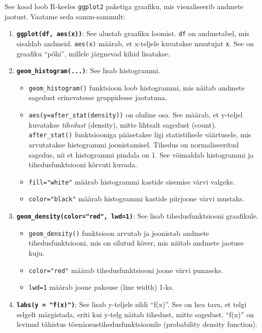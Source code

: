 \documentclass[
]{book}
\providecommand{\tightlist}{%
  \setlength{\itemsep}{0pt}\setlength{\parskip}{0pt}}
\theoremstyle{definition}
\theoremstyle{definition}
\theoremstyle{definition}
\theoremstyle{definition}
\theoremstyle{remark}
\begin{document}
See kood loob R-keeles \texttt{ggplot2} paketiga graafiku, mis visualiseerib andmete jaotust. Vaatame seda samm-sammult:

\begin{enumerate}
\def\labelenumi{\arabic{enumi}.}
\item
  \textbf{\texttt{ggplot(df,\ aes(x))}}: See alustab graafiku loomist. \texttt{df} on andmetabel, mis sisaldab andmeid. \texttt{aes(x)} määrab, et x-teljele kuvatakse muutujat \texttt{x}. See on graafiku ``põhi'', millele järgnevad kihid lisatakse.
\item
  \textbf{\texttt{geom\_histogram(...)}}: See lisab histogrammi.

  \begin{itemize}
  \tightlist
  \item
    \texttt{geom\_histogram()} funktsioon loob histogrammi, mis näitab andmete sagedust erinevatesse gruppidesse jaotatuna.
  \item
    \texttt{aes(y=after\_stat(density))} on oluline osa. See määrab, et y-teljel kuvatakse \emph{tihedust} (density), mitte lihtsalt sagedust (count). \texttt{after\_stat()} funktsiooniga pääsetakse ligi statistilisele väärtusele, mis arvutatakse histogrammi joonistamisel. Tihedus on normaliseeritud sagedus, nii et histogrammi pindala on 1. See võimaldab histogrammi ja tihedusfunktsiooni kõrvuti kuvada.
  \item
    \texttt{fill="white"} määrab histogrammi kastide sisemise värvi valgeks.
  \item
    \texttt{color="black"} määrab histogrammi kastide piirjoone värvi mustaks.
  \end{itemize}
\item
  \textbf{\texttt{geom\_density(color="red",\ lwd=1)}}: See lisab tihedusfunktsiooni graafikule.

  \begin{itemize}
  \tightlist
  \item
    \texttt{geom\_density()} funktsioon arvutab ja joonistab andmete tihedusfunktsiooni, mis on silutud kõver, mis näitab andmete jaotuse kuju.
  \item
    \texttt{color="red"} määrab tihedusfunktsiooni joone värvi punaseks.
  \item
    \texttt{lwd=1} määrab joone paksuse (line width) 1-ks.
  \end{itemize}
\item
  \textbf{\texttt{labs(y\ =\ "f(x)")}}: See lisab y-teljele sildi ``f(x)''. See on hea tava, et telgi selgelt märgistada, eriti kui y-telg näitab tihedust, mitte sagedust. ``f(x)'' on levinud tähistus tõenäosustihedusfunktsioonile (probability density function).
\end{enumerate}
\end{document}
